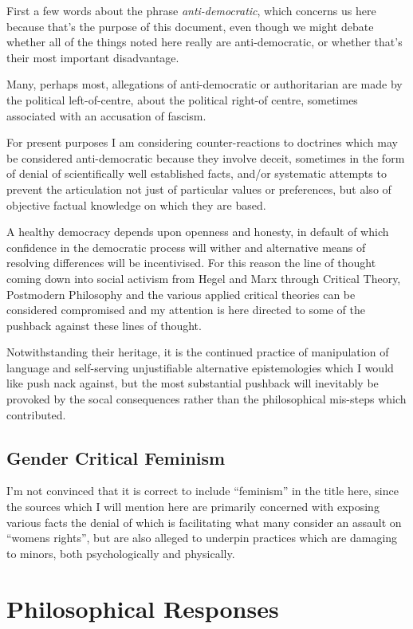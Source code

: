 \documentclass[10pt,titlepage]{book}
\begin{document}
First a few words about the phrase \emph{anti-democratic}, which concerns us here because that's the purpose of this document, even though we might debate whether all of the things noted here really are anti-democratic, or whether that's their most important disadvantage.

Many, perhaps most, allegations of anti-democratic or authoritarian are made by the political left-of-centre, about the political right-of centre, sometimes associated with an accusation of fascism.

For present purposes I am considering counter-reactions to doctrines which may be considered anti-democratic because they involve deceit, sometimes in the form of denial of scientifically well established facts, and/or systematic attempts to prevent the articulation not just of particular values or preferences, but also of objective factual knowledge on which they are based.

A healthy democracy depends upon openness and honesty, in default of which confidence in the democratic process will wither and alternative means of resolving differences will be incentivised.
For this reason the line of thought coming down into social activism from Hegel and Marx through Critical Theory, Postmodern Philosophy and the various applied critical theories can be considered compromised and my attention is here directed to some of the pushback against these lines of thought.

Notwithstanding their heritage, it is the continued practice of manipulation of language and self-serving unjustifiable alternative epistemologies which I would like push nack against, but the most substantial pushback will inevitably be provoked by the socal consequences rather than the philosophical mis-steps which contributed.

\subsection{Gender Critical Feminism}

I'm not convinced that it is correct to include ``feminism'' in the title here, since the sources which I will mention here are primarily concerned with exposing various facts the denial of which is facilitating what many consider an assault on ``womens rights'', but are also alleged to underpin practices which are damaging to minors, both psychologically and physically.

\section{Philosophical Responses}
\end{document}
